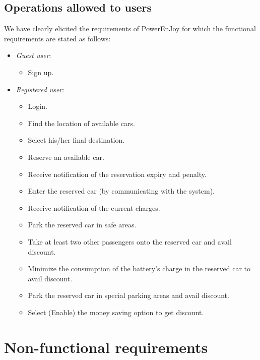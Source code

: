 \subsection{Operations allowed to users}
We have clearly elicited the requirements of PowerEnJoy for which the functional requirements are stated as follows:
\begin{itemize}
	\item \emph{Guest user}:
	\begin{itemize}
		\item Sign up.
	\end{itemize}

	\item \emph{Registered user}:
	\begin{itemize}
		\item Login.
		\item Find the location of available cars.
		\item Select his/her final destination.
		\item Reserve an available car.
		\item Receive notification of the reservation expiry and penalty.
		\item Enter the reserved car (by communicating with the system).
		\item Receive notification of the current charges.
		\item Park the reserved car in safe areas.
		\item Take at least two other passengers onto the reserved car and avail discount.
		\item Minimize the consumption of the battery's charge in the reserved car to avail discount.
		\item Park the reserved car in special parking areas and avail discount.
		\item Select (Enable) the money saving option to get discount.
	\end{itemize}
\end{itemize}

\section{Non-functional requirements}